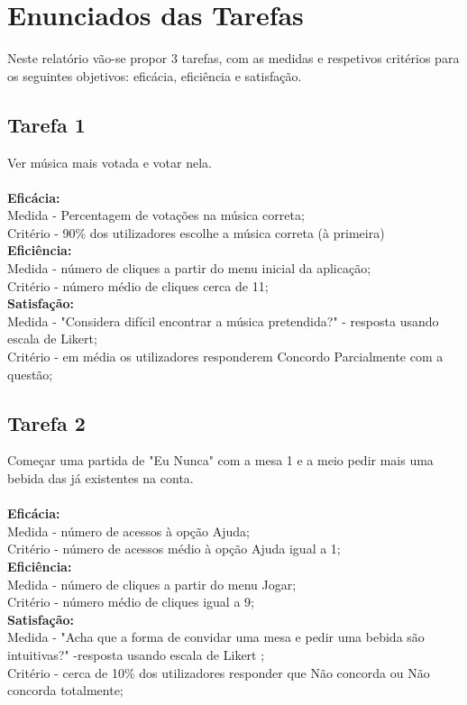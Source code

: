 \documentclass{article}
\begin{document}
\section*{Enunciados das Tarefas}
Neste relatório vão-se propor 3 tarefas, com as medidas e respetivos critérios para os seguintes objetivos: eficácia, eficiência e satisfação.

\subsection*{Tarefa 1}
Ver música mais votada e votar nela.\\\\
\textbf{Eficácia:}\\
Medida - Percentagem de votações na música correta;\\
Critério - 90\% dos utilizadores escolhe a música correta (à primeira)\\
\textbf{Eficiência:} \\
Medida - número de cliques a partir do menu inicial da aplicação;\\
Critério - número médio de cliques cerca de 11;\\
\textbf{Satisfação:}\\
Medida - "Considera difícil encontrar a música pretendida?" - resposta usando escala de Likert;\\
Critério - em média os utilizadores responderem Concordo Parcialmente com a questão;

\subsection*{Tarefa 2}
Começar uma partida de "Eu Nunca" com a mesa 1 e a meio pedir mais uma bebida das já existentes na conta.\\\\
\textbf{Eficácia:}\\
Medida - número de acessos à opção Ajuda;\\
Critério - número de acessos médio à opção Ajuda igual a 1;\\
\textbf{Eficiência:}\\
Medida - número de cliques a partir do menu Jogar;\\
Critério - número médio de cliques igual a 9;\\
\textbf{Satisfação:}\\
Medida - "Acha que a forma de convidar uma mesa e pedir uma bebida são intuitivas?" -resposta usando escala de Likert ;\\
Critério - cerca de 10\% dos utilizadores responder que Não concorda ou Não concorda totalmente;
\end{document}
